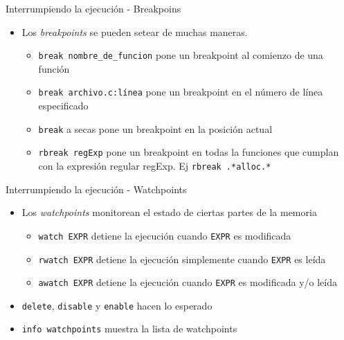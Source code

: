 \documentclass[xetex]{beamer}
\begin{document}
\begin{frame}[fragile]{Interrumpiendo la ejecución - Breakpoins}
\begin{itemize}
\item Los {\it breakpoints} se pueden setear de muchas maneras.
\begin{itemize}
\item \verb=break nombre_de_funcion= pone un breakpoint al comienzo de una función 
\item \verb=break archivo.c:línea= pone un breakpoint en el número de línea especificado 
\item \verb=break= a secas pone un breakpoint en la posición actual
\item \verb=rbreak regExp= pone un breakpoint en todas la funciones que cumplan con la expresión regular regExp. Ej \verb=rbreak .*alloc.*=

\end{itemize}
\end{itemize}
\end{frame}

\begin{frame}[fragile]{Interrumpiendo la ejecución - Watchpoints}
\begin{itemize}
\item Los {\it watchpoints} monitorean el estado de ciertas partes de la memoria
\begin{itemize}
\item \verb=watch EXPR= detiene la ejecución cuando \verb=EXPR= es modificada
\item \verb=rwatch EXPR= detiene la ejecución simplemente cuando \verb=EXPR= es leída
\item \verb=awatch EXPR= detiene la ejecución cuando \verb=EXPR= es modificada y/o leída
\end{itemize}
\item \verb=delete=, \verb=disable= y \verb=enable= hacen lo esperado
\item \verb=info watchpoints= muestra la lista de watchpoints
\end{itemize}
\end{frame}
\end{document}

